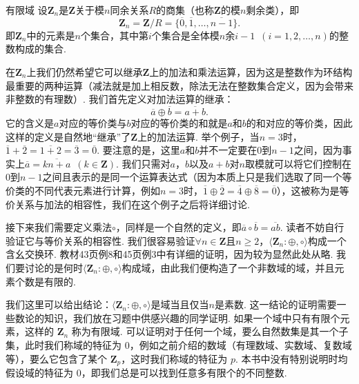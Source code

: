 \begin{example}{}{有限域}
    设$\mathbf{Z}_n$是$\mathbf{Z}$关于模$n$同余关系$R$的商集（也称$\mathbf{Z}$的模$n$剩余类），即
    \[\mathbf{Z}_n=\mathbf{Z}/R=\{\overline{0},\overline{1},\ldots,\overline{n-1}\}.\]
    即$\mathbf{Z}_n$中的元素是$n$个集合，其中第$i$个集合是全体模$n$余$i-1\enspace(i=1,2,\ldots,n)$的整数构成的集合.

    在$\mathbf{Z}_n$上我们仍然希望它可以继承$\mathbf{Z}$上的加法和乘法运算，因为这是整数作为环结构最重要的两种运算（减法就是加上相反数，除法无法在整数集合定义，因为会带来非整数的有理数）. 我们首先定义对加法运算的继承：
    \[\overline{a}\oplus\overline{b}=\overline{a+b}.\]
    它的含义是$a$对应的等价类与$b$对应的等价类的和就是$a$和$b$的和对应的等价类，因此这样的定义是自然地``继承''了$\mathbf{Z}$上的加法运算. 举个例子，当$n=3$时，$\overline{1}+\overline{2}=\overline{1+2}=\overline{3}=\overline{0}$. 要注意的是，这里$a$和$b$并不一定要在$0$到$n-1$之间，因为事实上$\overline{a}=\overline{kn+a}\enspace(k\in\mathbf{Z})$. 我们只需对$a$，$b$以及$a+b$对$n$取模就可以将它们控制在$0$到$n-1$之间且表示的是同一个运算表达式（因为本质上只是我们选取了同一个等价类的不同代表元素进行计算，例如$n=3$时，$\overline{1}\oplus\overline{2}=\overline{4}\oplus\overline{8}=\overline{0}$），这被称为是等价关系与加法的相容性，我们在这个例子之后将详细讨论.

    接下来我们需要定义乘法$\circ$，同样是一个自然的定义，即$\overline{a}\circ\overline{b}=\overline{ab}$. 读者不妨自行验证它与等价关系的相容性. 我们很容易验证$\forall n\in\mathbf{Z}$且$n\geqslant 2$，$\langle \mathbf{Z}_n\colon\oplus,\circ\rangle$构成一个含幺交换环. 教材43页例8和45页例3中有详细的证明，因为较为显然此处从略. 我们要讨论的是何时$\langle \mathbf{Z}_n\colon\oplus,\circ\rangle$构成域，由此我们便构造了一个非数域的域，并且元素个数是有限的.

    我们这里可以给出结论：$\langle \mathbf{Z}_n\colon\oplus,\circ\rangle$是域当且仅当$n$是素数. 这一结论的证明需要一些数论的知识，我们放在习题中供感兴趣的同学证明. 如果一个域中只有有限个元素，这样的 $\mathbf{Z}_n$ 称为有限域. 可以证明对于任何一个域，要么自然数集是其一个子集，此时我们称域的特征为 $0$，例如之前介绍的数域（有理数域、实数域、复数域等），要么它包含了某个 $\mathbf{Z}_p$，这时我们称域的特征为 $p$. 本书中没有特别说明时均假设域的特征为 $0$，即我们总是可以找到任意多有限个的不同整数.
\end{example}

